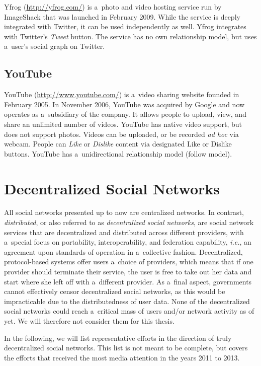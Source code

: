Yfrog (\url{http://yfrog.com/})
is a~photo and video hosting service run by ImageShack
that was launched in February 2009.
While the service is deeply integrated with Twitter,
it can be used independently as well.
Yfrog integrates with Twitter's \emph{Tweet} button.
The service has no own relationship model,
but uses a~user's social graph on Twitter.

\subsection{YouTube}

YouTube (\url{http://www.youtube.com/})
is a~video sharing website founded in February 2005.
In November 2006, YouTube was acquired by Google
and now operates as a~subsidiary of the company.
It allows people to upload, view,
and share an unlimited number of videos.
YouTube has native video support, but does not support photos.
Videos can be uploaded, or be recorded \emph{ad hoc} via webcam.
People can \emph{Like} or \emph{Dislike} content
via designated Like or Dislike buttons.
YouTube has a~unidirectional relationship model (follow model).

\section{Decentralized Social Networks}
All social networks presented up to now are centralized networks.
In contrast, \emph{distributed}, or also referred to as
\emph{decentralized social networks}, are
social network services that are decentralized and distributed
across different providers, with a~special focus on
portability, interoperability, and federation capability,
\emph{i.e.}, an agreement upon standards of operation
in a~collective fashion.
Decentralized, protocol-based systems
offer users a~choice of providers, which means
that if one provider should terminate their service,
the user is free to take out her data and start
where she left off with a~different provider.
As a~final aspect, governments cannot effectively censor
decentralized social networks,
as this would be impracticable
due to the distributedness of user data.
None of the decentralized social networks could reach
a~critical mass of users and/or network activity as of yet.
We will therefore not consider them for this thesis.

In the following, we will list representative efforts 
in the direction of truly decentralized social networks.
This list is not meant to be complete,
but covers the efforts that received the most media attention
in the years 2011 to 2013.

